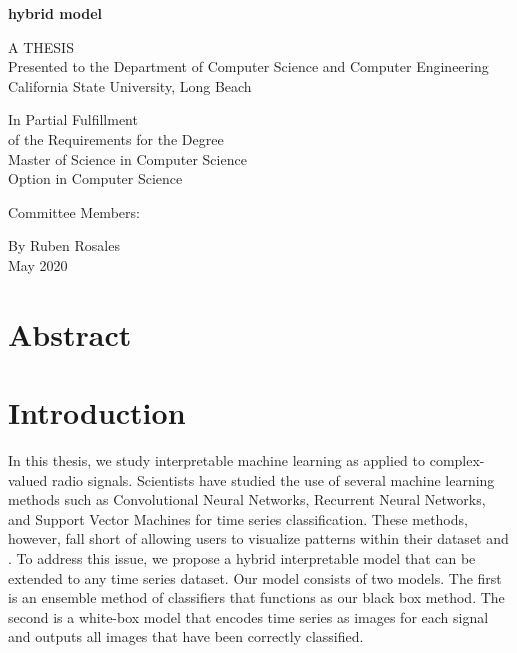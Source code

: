 \documentclass{turabian-thesis}
\begin{document}
\frontmatter
\thispagestyle{empty}

\begin{center}
   
   \textbf{hybrid model}
   
   \vspace*{\baselineskip} 
      
   A THESIS \\
   Presented to the Department of Computer Science and Computer Engineering \\
   California State University, Long Beach
   
   \vspace*{\baselineskip} 

   In Partial Fulfillment \\
   of the Requirements for the Degree \\
   Master of Science in Computer Science \\
   Option in Computer Science
   
   \vspace*{\baselineskip} 

   Committee Members: \\
   
   \vspace*{\baselineskip} 

   By Ruben Rosales \\
   May 2020
\end{center}

\pagebreak

\chapter*{Abstract}

\tableofcontents
\listofillustrations

\mainmatter

\chapter{Introduction}
In this thesis, we study interpretable machine learning as applied to complex-valued radio signals. Scientists have studied the use of several machine learning methods such as Convolutional Neural Networks, Recurrent Neural Networks, and Support Vector Machines for time series classification. These methods, however, fall short of allowing users to visualize patterns within their dataset and . To address this issue, we propose a hybrid interpretable model that can be extended to any time series dataset. Our model consists of two models. The first is an ensemble method of classifiers that functions as our black box method. The second is a white-box model that encodes time series as images for each signal and outputs all images that have been correctly classified.
\end{document}
